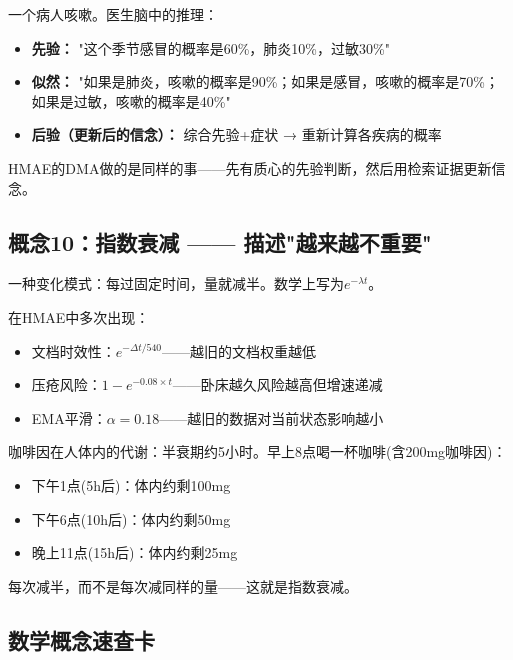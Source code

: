 \documentclass[11pt,a4paper]{ctexart}
\begin{document}
\begin{exambox}[医生看病的贝叶斯思维]
一个病人咳嗽。医生脑中的推理：
\begin{itemize}[nosep]
\item \textbf{先验：} "这个季节感冒的概率是60\%，肺炎10\%，过敏30\%"
\item \textbf{似然：} "如果是肺炎，咳嗽的概率是90\%；如果是感冒，咳嗽的概率是70\%；如果是过敏，咳嗽的概率是40\%"
\item \textbf{后验（更新后的信念）：} 综合先验+症状 → 重新计算各疾病的概率
\end{itemize}
HMAE的DMA做的是同样的事——先有质心的先验判断，然后用检索证据更新信念。
\end{exambox}

\subsection{概念10：指数衰减 —— 描述"越来越不重要"}

\begin{defbox}
一种变化模式：每过固定时间，量就减半。数学上写为$e^{-\lambda t}$。
\end{defbox}

在HMAE中多次出现：
\begin{itemize}[nosep]
\item 文档时效性：$e^{-\Delta t / 540}$——越旧的文档权重越低
\item 压疮风险：$1-e^{-0.08 \times t}$——卧床越久风险越高但增速递减
\item EMA平滑：$\alpha=0.18$——越旧的数据对当前状态影响越小
\end{itemize}

\begin{exambox}[生活中的指数衰减]
咖啡因在人体内的代谢：半衰期约5小时。早上8点喝一杯咖啡(含200mg咖啡因)：
\begin{itemize}[nosep]
\item 下午1点(5h后)：体内约剩100mg
\item 下午6点(10h后)：体内约剩50mg
\item 晚上11点(15h后)：体内约剩25mg
\end{itemize}
每次减半，而不是每次减同样的量——这就是指数衰减。
\end{exambox}

\subsection{数学概念速查卡}
\end{document}
